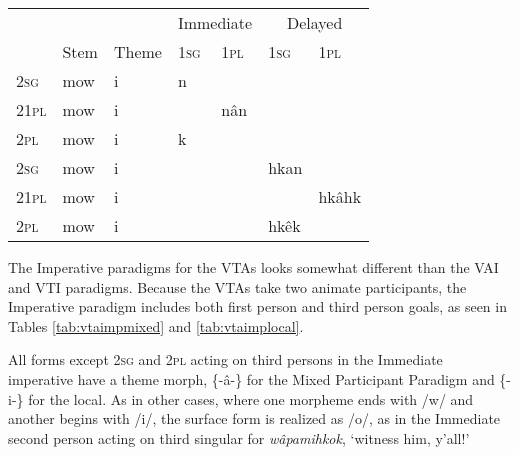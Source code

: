 \begin{table*}[h]
\centering
\begin{tabular}{llll|l||l|l}
    \toprule
                 &      &       & \multicolumn{2}{c}{Immediate}      & \multicolumn{2}{c}{Delayed}   \\
                 & Stem & Theme & 1\textsc{sg} & 1\textsc{pl} & 1\textsc{sg}  & 1\textsc{pl}   \\ 
\midrule
2\textsc{sg}     &  mow    &  i     & n             &             &               &                \\
21\textsc{pl}    &  mow    &  i     &               & nân         &               &                 \\
2\textsc{pl}     &  mow    &  i     & k             &             &               &                  \\
\hline
\hline
2\textsc{sg}     &  mow    &  i     &               &             & hkan          &                   \\
21\textsc{pl}    &  mow    &  i     &               &             &               & hkâhk             \\
2\textsc{pl}     &  mow    &  i     &               &             & hkêk          &                     \\

    \bottomrule
  \end{tabular}
  \caption{
    VTA Imperative Local \citep[403]{Wolvengrey2011}. \label{tab:vtaimplocal}
  }
\end{table*}

The Imperative paradigms for the VTAs looks somewhat different than the VAI and VTI paradigms. Because the VTAs take two animate participants, the Imperative paradigm includes both first person and third person goals, as seen in Tables \ref{tab:vtaimpmixed} and \ref{tab:vtaimplocal}.


All forms except 2\textsc{sg} and 2\textsc{pl} acting on third persons in the Immediate imperative have a theme morph, \{-â-\} for the Mixed Participant Paradigm and \{-i-\} for the local. As in other cases, where one morpheme ends with /w/ and another begins with /i/, the surface form is realized as /o/, as in the Immediate second person acting on third singular for \textit{wâpamihkok}, `witness him, y'all!'

